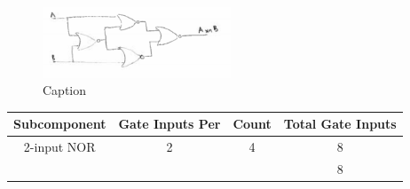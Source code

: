 \documentclass{article}
\begin{document}
\begin{figure}[!ht]
\centering
\includegraphics[width=0.5\textwidth]{img/xnor}
\caption{Caption}
\label{fig:xnor}
\end{figure}

\begin{center}
\begin{tabular}{ ccc|c }
 \textbf{Subcomponent} & \textbf{Gate Inputs Per} & \textbf{Count} & \textbf{Total Gate Inputs} \\
 \hline
 2-input NOR & 2 & 4 & 8 \\
 \hline
 &&& 8\\
\end{tabular}
\end{center}
\end{document}
